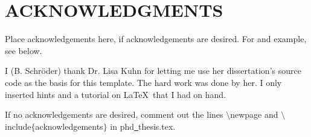 \chapter*{ACKNOWLEDGMENTS}

Place acknowledgements here, if acknowledgements are desired.
For and example, see below.

I (B. Schr\"oder) thank Dr. Lisa Kuhn for letting me use her
dissertation's source code as the basis for this template.
The hard work was done by her. I only inserted hints and a
tutorial on \LaTeX \
that I had on hand.


If no acknowledgements are desired, comment out
the lines
$\setminus $newpage
and
$\setminus $include$\{ $acknowledgements$\} $
in phd\underline{~}thesis.tex.

